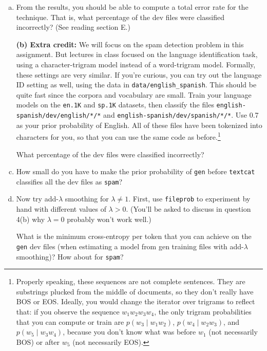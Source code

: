 \documentclass[12pt]{article}
\theoremstyle{plain}
\theoremstyle{definition}
\theoremstyle{remark}
\begin{document}
\begin{enumerate}[(a)]
\item From the results, you should be able to compute a total error rate for the technique. That is, what percentage of the dev files were classified incorrectly? (See reading section E.)

\item[\textbf{(b) Extra credit:}] We will focus on the spam detection problem in this assignment. But lectures in class focused on the language identification task, using a character-trigram model instead of a word-trigram model. Formally, these settings are very similar. If you’re curious, you can try out the language ID setting as well, using the data in \texttt{data/english\_spanish}. This should be quite fast since the corpora and vocabulary are small. Train your language models on the \texttt{en.1K} and \texttt{sp.1K} datasets, then classify the files \texttt{english-spanish/dev/english/*/*} and \texttt{english-spanish/dev/spanish/*/*}. Use 0.7 as your prior probability of English. All of these files have been tokenized into characters for you, so that you can use the same code as before.\footnote{Properly speaking, these sequences are not complete sentences. They are substrings plucked from the middle of documents, so they don’t really have BOS or EOS. Ideally, you would change the iterator over trigrams to reflect that: if you observe the sequence $w_1w_2w_3w_4$, the only trigram probabilities that you can compute or train are $p(w_3 \mid w_1w_2)$, $p(w_4 \mid w_2w_3)$, and $p(w_5 \mid w_3w_4)$, because you don’t know what was before $w_1$ (not necessarily BOS) or after $w_5$ (not necessarily EOS).} 

What percentage of the dev files were classified incorrectly?

\item How small do you have to make the prior probability of \texttt{gen} before \texttt{textcat} classifies all the dev files as \texttt{spam}?

\item Now try add-$\lambda$ smoothing for $\lambda \neq 1$. First, use \texttt{fileprob} to experiment by hand with different values of $\lambda > 0$. (You’ll be asked to discuss in question 4(b) why $\lambda = 0$ probably won’t work well.)

What is the minimum cross-entropy per token that you can achieve on the \texttt{gen} dev files (when estimating a model from gen training files with add-$\lambda$ smoothing)? How about for \texttt{spam}?


\end{enumerate}
\end{document}

